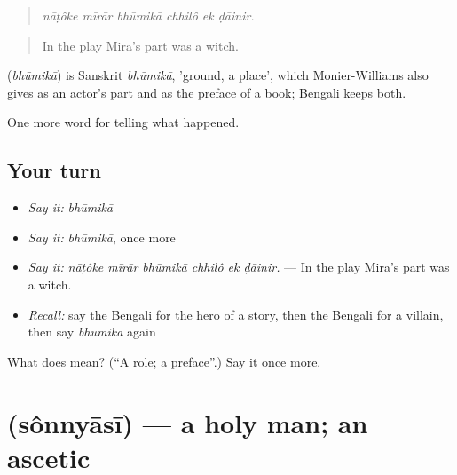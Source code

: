 \begin{quote}
     
\end{quote}

\begin{quote}
\emph{nāṭôke mīrār bhūmikā chhilô ek ḍāinir.}
\end{quote}

\begin{quote}
In the play Mira's part was a witch.
\end{quote}

\begin{cousinweb}
\textbf{} (\emph{bhūmikā}) is Sanskrit \emph{bhūmikā}, 'ground, a place', which Monier-Williams also gives as an actor's part and as the preface of a book; Bengali keeps both.
\end{cousinweb}

\begin{grammarlens}[title={What you've built}]
One more word for telling what happened.
\end{grammarlens}

\subsection*{Your turn}
\begin{itemize}
\raggedright
  \item \emph{Say it:} \emph{bhūmikā}
  \item \emph{Say it:} \emph{bhūmikā}, once more
  \item \emph{Say it:} \emph{nāṭôke mīrār bhūmikā chhilô ek ḍāinir.} — In the play Mira's part was a witch.
  \item \emph{Recall:} say the Bengali for the hero of a story, then the Bengali for a villain, then say \emph{bhūmikā} again
\end{itemize}

\begin{tcolorbox}[breakable,colback=teal!4,colframe=teal!35!black,title={Before you move on}]
What does  mean? (\textquotedblleft{}A role; a preface\textquotedblright{}.) Say it once more.
\end{tcolorbox}
\section[\texorpdfstring{\bn{সন্ন্যাসী} (sônnyāsī)}{সন্ন্যাসী (sônnyāsī)}]{ (sônnyāsī) — a holy man; an ascetic}

